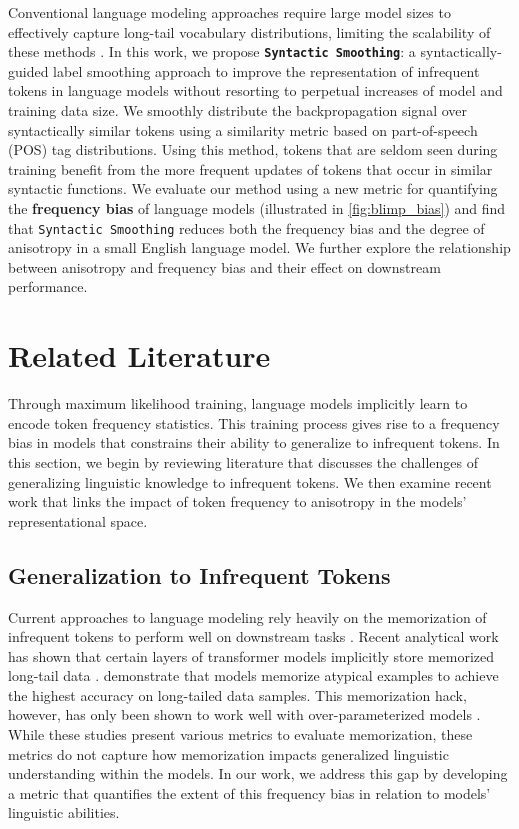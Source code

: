 Conventional language modeling approaches require large model sizes to effectively capture long-tail vocabulary distributions, limiting the scalability of these methods \citep{feldman2020does,haviv2023understanding}. In this work, we propose \textbf{\texttt{Syntactic Smoothing}}: a syntactically-guided label smoothing approach to improve the representation of infrequent tokens in language models without resorting to perpetual increases of model and training data size. We smoothly distribute the backpropagation signal over syntactically similar tokens using a similarity metric based on part-of-speech (POS) tag distributions. Using this method, tokens that are seldom seen during training benefit from the more frequent updates of tokens that occur in similar syntactic functions. 
We evaluate our method using a new metric for quantifying the \textbf{frequency bias} of language models (illustrated in \cref{fig:blimp_bias}) and find that \texttt{Syntactic Smoothing} reduces both the frequency bias and the degree of anisotropy in a small English language model. We further explore the relationship between anisotropy and frequency bias and their effect on downstream performance.

\section{Related Literature}

Through maximum likelihood training, language models implicitly learn to encode token frequency statistics. This training process gives rise to a frequency bias in models that constrains their ability to generalize to infrequent tokens. In this section, we begin by reviewing literature that discusses the challenges of generalizing linguistic knowledge to infrequent tokens. We then examine recent work that links the impact of token frequency to anisotropy in the models' representational space.

\subsection{Generalization to Infrequent Tokens}

Current approaches to language modeling rely heavily on the memorization of infrequent tokens to perform well on downstream tasks \citep{feldman2020does}. Recent analytical work has shown that certain layers of transformer models implicitly store memorized long-tail data \citep{haviv2023understanding, kobayashi2023transformer}. \citet{feldman2020neural} demonstrate that models memorize atypical examples to achieve the highest accuracy on long-tailed data samples. This memorization hack, however, has only been shown to work well with over-parameterized models \citep{belkin2019reconciling}. While these studies present various metrics to evaluate memorization, these metrics do not capture how memorization impacts generalized linguistic understanding within the models. In our work, we address this gap by developing a metric that quantifies the extent of this frequency bias in relation to models' linguistic abilities.

